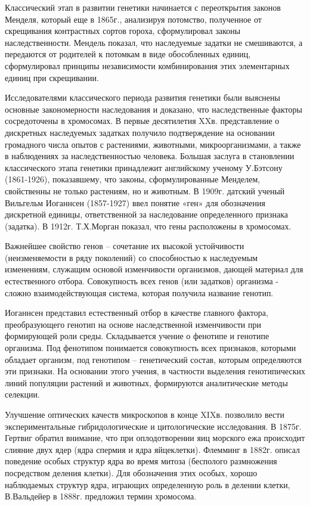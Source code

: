\documentclass[exam_answers.tex]{subfiles}
\begin{document}
Классический этап в развитии генетики начинается с переоткрытия
законов Менделя, который еще в 1865г., анализируя потомство, полученное от
скрещивания контрастных сортов гороха, сформулировал законы
наследственности. Мендель показал, что наследуемые задатки не смешиваются,
а передаются от родителей к потомкам в виде обособленных единиц,
сформулировал принципы независимости комбинирования этих элементарных
единиц при скрещивании.

Исследователями классического периода развития генетики были
выяснены основные закономерности наследования и доказано, что
наследственные факторы сосредоточены в хромосомах. В первые десятилетия
XXв. представление о дискретных наследуемых задатках получило
подтверждение на основании громадного числа опытов с растениями,
животными, микроорганизмами, а также в наблюдениях за наследственностью
человека. Большая заслуга в становлении классического этапа генетики
принадлежит английскому ученому У.Бэтсону (1861-1926), показавшему, что
законы, сформулированные Менделем, свойственны не только растениям, но и
животным. В 1909г. датский ученый Вильгельм Иоганнсен (1857-1927) ввел
понятие «ген» для обозначения дискретной единицы, ответственной за
наследование определенного признака (задатка).
В 1912г. Т.Х.Морган показал, что гены расположены в хромосомах.

Важнейшее свойство генов – сочетание их высокой устойчивости
(неизменяемости в ряду поколений) со способностью к наследуемым
изменениям, служащим основой изменчивости организмов, дающей материал
для естественного отбора. Совокупность всех генов (или задатков) организма -
сложно взаимодействующая система, которая получила название генотип.

Иоганнсен представил естественный отбор в качестве главного фактора,
преобразующего генотип на основе наследственной изменчивости при
формирующей роли среды. Складывается учение о фенотипе и генотипе
организма. Под фенотипом понимается совокупность всех признаков,
которыми обладает организм, под генотипом – генетический состав, которым
определяются эти признаки. На основании этого учения, в частности выделения
генотипических линий популяции растений и животных, формируются
аналитические методы селекции.

Улучшение оптических качеств микроскопов в конце XIXв. позволило
вести экспериментальные гибридологические и цитологические исследования.
В 1875г. Гертвиг обратил внимание, что при оплодотворении яиц морского ежа
происходит слияние двух ядер (ядра спермия и ядра яйцеклетки). Флемминг в
1882г. описал поведение особых структур ядра во время митоза (бесполого
размножения посредством деления клетки). Для обозначения этих особых,
хорошо наблюдаемых структур ядра, играющих определенную роль в делении
клетки, В.Вальдейер в 1888г. предложил термин хромосома.
\end{document}
